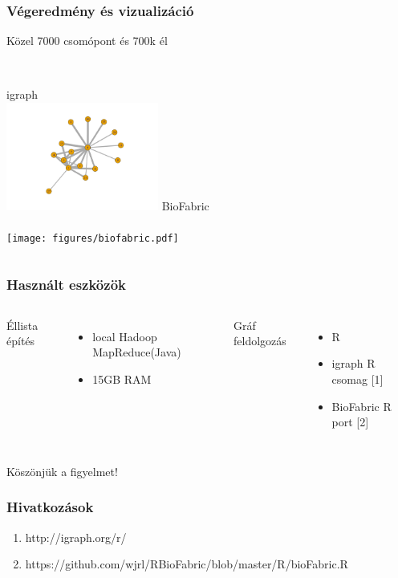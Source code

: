 \documentclass{beamer}
\begin{document}
\begin{frame}
\frametitle{Végeredmény és vizualizáció}
Közel 7000 csomópont és 700k él \\~\\
\begin{columns}[t]
	
		\centering
		igraph \\
		\includegraphics[width = 5cm, trim = 7.5cm 1cm 5.5cm 1cm, clip]{figures/groups.pdf}
		\centering
		BioFabric \\~\\
		\texttt{[image: figures/biofabric.pdf]}
\end{columns}
\end{frame}

\begin{frame}
\frametitle{Használt eszközök} %
\begin{columns}[t]
		Éllista építés
      \begin{itemize}
        \item local Hadoop MapReduce(Java)
        \item 15GB RAM
      \end{itemize}
		Gráf feldolgozás
      \begin{itemize}
		\item R
        \item igraph R csomag [1]
		\item BioFabric R port [2]
      \end{itemize}
\end{columns}
\end{frame}


\begin{frame}[plain]
\Huge{\centerline{Köszönjük a figyelmet!}}
\end{frame}

\begin{frame}[plain]
\frametitle{Hivatkozások}
\small{
\begin{enumerate}
\item http://igraph.org/r/
\item https://github.com/wjrl/RBioFabric/blob/master/R/bioFabric.R
\end{enumerate}
}
\end{frame}


\end{document}
